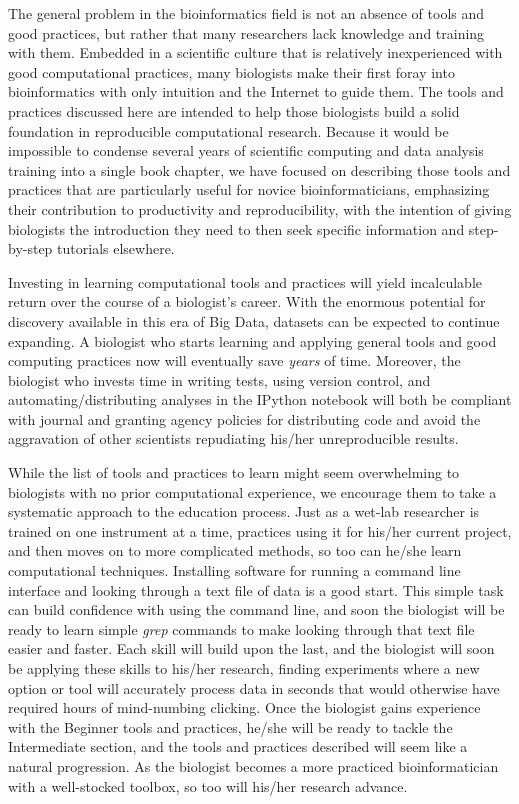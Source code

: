 \documentclass[ChapterTOCs,krantz2]{krantz} %
\begin{document}
The general problem in the
bioinformatics field is not an absence of tools and good practices, but rather
that many researchers lack knowledge and training with them\cite{Merali2010}.  Embedded in a scientific
culture that is relatively inexperienced with good computational practices, 
many biologists make their
first foray into bioinformatics with only intuition and the Internet to guide
them.  The tools and practices discussed here are intended to help
those biologists build a solid foundation in reproducible computational
research.  Because it would be impossible to condense several years of
scientific computing and data analysis training into a single book chapter, we
have focused on describing those tools and practices that are particularly
useful for novice bioinformaticians, emphasizing their contribution to 
productivity and reproducibility, with the intention of giving biologists the
introduction they need to then seek specific information and step-by-step
tutorials elsewhere. 

Investing in learning computational tools and practices will yield incalculable
return over the course of a biologist's career.  With the enormous potential
for discovery available in this era of Big Data, datasets can be expected to
continue expanding.  A biologist who starts learning and applying general tools
and good computing practices now will eventually save \emph{years} of time.
Moreover, the biologist who invests time in writing tests, using version
control, and automating/distributing analyses in the IPython notebook will both
be compliant with journal and granting agency policies for distributing code
and avoid the aggravation of other scientists repudiating his/her
unreproducible results.

While the list of tools and practices to learn might seem overwhelming to
biologists with no prior computational experience, we encourage them to take a
systematic approach to the education process.  Just as a wet-lab researcher is
trained on one instrument at a time, practices using it for
his/her current project, and then moves on to more complicated methods, so too
can he/she learn computational techniques.  Installing software for
running a command line interface and looking through a text file of data is a
good start.  This simple task can build confidence with using the command line,
and soon the biologist will be ready to learn simple \emph{grep} commands to make
looking through that text file easier and faster.  Each skill will build upon
the last, and the biologist will soon be applying these skills to his/her
research, finding experiments where a new option or tool will
accurately process data in seconds that would otherwise have required hours of
mind-numbing clicking.  Once the biologist gains experience with the Beginner
tools and practices, he/she will be ready to tackle the Intermediate section,
and the tools and practices described will seem like a natural progression.  As
the biologist becomes a more practiced bioinformatician with a well-stocked
toolbox, so too will his/her research advance.  
\end{document}
